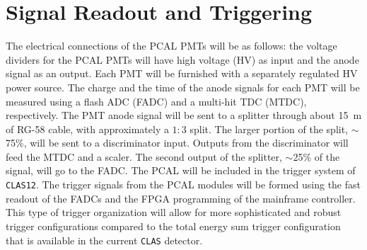 \section{Signal Readout and Triggering}

The electrical connections of the PCAL PMTs will be as follows: the
voltage dividers for the PCAL PMTs will have high voltage (HV) as input and 
the anode signal as an output.  Each PMT will be furnished with a separately 
regulated HV power source.  The charge and the time of the anode signals for 
each PMT will be measured using a flash ADC (FADC) and a multi-hit TDC (MTDC),
respectively.  The PMT anode signal will be sent to a splitter through about 
15~m of RG-58 cable, with approximately a $1:3$ split.  The larger portion 
of the split, $\sim$75\%, will be sent to a discriminator input.  Outputs from 
the discriminator will feed the MTDC and a scaler. The second output of the 
splitter, $\sim$25\% of the signal, will go to the FADC.  The PCAL will be 
included in the trigger system of {\tt CLAS12}.  The trigger signals from 
the PCAL modules will be formed using the fast readout of the FADCs and the 
FPGA programming of the mainframe controller.  This type of trigger 
organization will allow for more sophisticated and robust trigger 
configurations compared to the total energy sum trigger configuration that
is available in the current {\tt CLAS} detector.  

